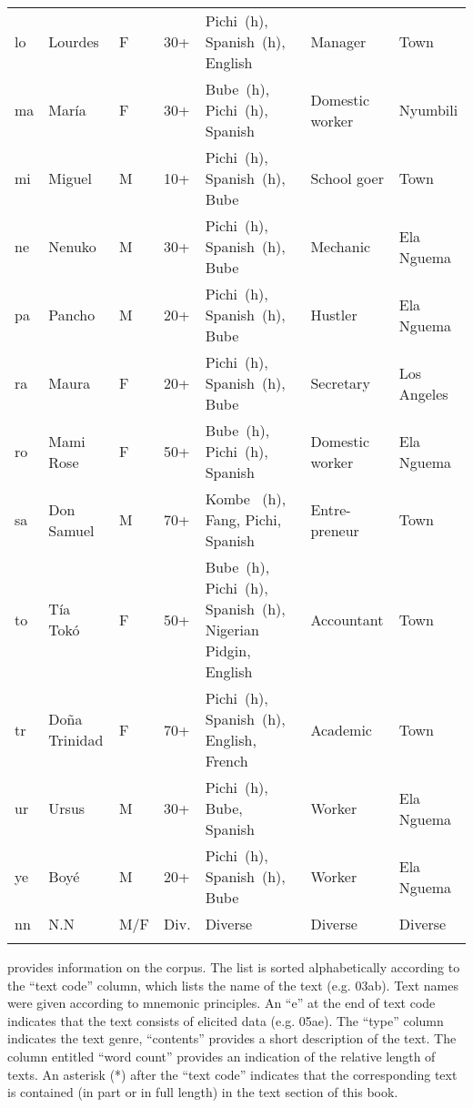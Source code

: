 \begin{longtable}{>{\footnotesize}l@{~}>{\footnotesize}l@{~} >{\footnotesize}l@{~}>{\footnotesize}l >{\footnotesize\raggedright}p{3cm} >{\footnotesize\raggedright}p{2cm} >{\footnotesize}l}
lo & Lourdes & \textsc{F} & 30+ & Pichi~(h), Spanish~(h), English & Manager & Town\\
ma & María & \textsc{F} & 30+ & Bube~(h), Pichi~(h), Spanish & Domestic worker & Nyumbili\\
mi & Miguel & M & 10+ & Pichi~(h), Spanish~(h), Bube & School goer & Town\\
ne & Nenuko & M & 30+ & Pichi~(h), Spanish~(h), Bube & Mechanic & Ela Nguema\\
pa & Pancho & M & 20+ & Pichi~(h), Spanish~(h), Bube & Hustler & Ela Nguema\\
ra & Maura & \textsc{F} & 20+ & Pichi~(h), Spanish~(h), Bube & Secretary & Los Angeles\\
ro & Mami Rose & \textsc{F} & 50+ & Bube~(h), Pichi~(h), Spanish & Domestic worker & Ela Nguema\\
sa & Don Samuel & M & 70+ & Kombe ~(h), Fang, Pichi, Spanish & Entre-preneur & Town\\
to & Tía Tokó & \textsc{F} & 50+ & Bube~(h), Pichi~(h), Spanish~(h), Nigerian Pidgin, English & Accountant & Town\\
tr & Doña Trinidad & \textsc{F} & 70+ & Pichi~(h), Spanish~(h), English, French & Academic & Town\\
ur & Ursus & M & 30+ & Pichi~(h), Bube, Spanish & Worker & Ela Nguema\\
ye & Boyé & M & 20+ & Pichi~(h), Spanish~(h), Bube & Worker & Ela Nguema\\
nn & N.N & M/\textsc{F} & Div. & Diverse & Diverse & Diverse\\
\lspbottomrule
\end{longtable}

 provides information on the corpus. The list is sorted alphabetically according to the “text code” column, which lists the name of the text (e.g. 03ab). Text names were given according to mnemonic principles. An “e” at the end of text code indicates that the text consists of elicited data (e.g. 05ae). The “type” column indicates the text genre, “contents” provides a short description of the text. The column entitled “word count” provides an indication of the relative length of texts. An asterisk (*) after the “text code” indicates that the corresponding text is contained (in part or in full length) in the text section of this book.


